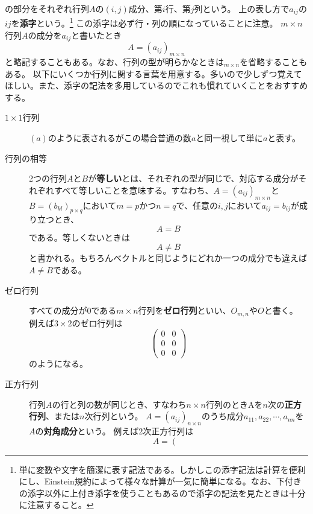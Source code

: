 \documentclass[10pt]{jsarticle}
\numberwithin{equation}{section}%
\begin{document}
の部分をそれぞれ行列$A$の$(i,j)$成分、第$i$行、第$j$列という。
上の表し方で$a_{ij}$の$ij$を{\bf 添字}という。\footnote{単に変数や文字を簡潔に表す記法である。しかしこの添字記法は計算を便利にし、Einstein規約によって様々な計算が一気に簡単になる。なお、下付きの添字以外に上付き添字を使うこともあるので添字の記法を見たときは十分に注意すること。}
この添字は必ず行・列の順になっていることに注意。
$m\times n$行列$A$の成分を$a_{ij}$と書いたとき
\begin{equation}
  A=(a_{ij})_{m\times n}
\end{equation}
と略記することもある。なお、行列の型が明らかなときは${}_{m\times n}$を省略することもある。
以下にいくつか行列に関する言葉を用意する。多いので少しずつ覚えてほしい。また、添字の記法を多用しているのでこれも慣れていくことをおすすめする。
\begin{description}
  \item[$1\times 1$行列] $(a)$のように表されるがこの場合普通の数$a$と同一視して単に$a$と表す。
  \item[行列の相等] 2つの行列$A$と$B$が{\bf 等しい}とは、それぞれの型が同じで、対応する成分がそれぞれすべて等しいことを意味する。すなわち、$A=(a_{ij})_{m\times n}$と$B=(b_{kl})_{p\times q}$において$m=p$かつ$n=q$で、任意の$i,j$において$a_{ij}=b_{ij}$が成り立つとき、
  \begin{equation}
    A=B
  \end{equation}
  である。等しくないときは
  \begin{equation}
  A\neq B 
  \end{equation}
  と書かれる。もちろんベクトルと同じようにどれか一つの成分でも違えば$A\neq B$である。
  \item[ゼロ行列] すべての成分が0である$m\times n$行列を{\bf ゼロ行列}といい、$O_{m,n}$や$O$と書く。
  例えば$3\times 2$のゼロ行列は
  \begin{equation}\left( 
    \begin{matrix}
      0 & 0\\
      0 & 0\\
      0 & 0
    \end{matrix}\right) 
  \end{equation}
  のようになる。
  \item[正方行列] 行列$A$の行と列の数が同じとき、すなわち$n\times n$行列のときAを$n$次の{\bf 正方行列}、または$n$次行列という。
 $A=(a_{ij})_{n\times n}$のうち成分$a_{11},a_{22},\cdots,a_{nn}$を$A$の{\bf 対角成分}という。
  例えば2次正方行列は
   \begin{equation}
  A=\left( 
\begin{matrix}

\end{matrix}
\end{equation}
\end{description}
\end{document}
